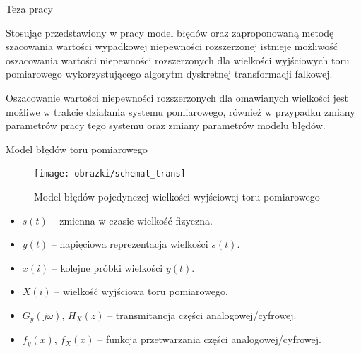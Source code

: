 \documentclass[12pt, polish, aspectratio = 169]{slides}
\begin{document}

\begin{frame}{Teza pracy}
\begin{justify}
Stosując przedstawiony w pracy model błędów oraz zaproponowaną metodę szacowania wartości wypadkowej niepewności rozszerzonej istnieje możliwość oszacowania wartości niepewności rozszerzonych dla wielkości wyjściowych toru pomiarowego wykorzystującego algorytm dyskretnej transformacji falkowej.

Oszacowanie wartości niepewności rozszerzonych dla omawianych wielkości jest możliwe w trakcie działania systemu pomiarowego, również w przypadku zmiany parametrów pracy tego systemu oraz zmiany parametrów modelu błędów.
\end{justify}
\end{frame}


\begin{frame}{Model błędów toru pomiarowego}
\begin{figure}
\texttt{[image: obrazki/schemat\_trans]}
\caption{Model błędów pojedynczej wielkości wyjściowej toru pomiarowego}
\end{figure}
\begin{itemize}
\item $s(t)$ -- zmienna w czasie wielkość fizyczna.
\item $y(t)$ -- napięciowa reprezentacja wielkości $s(t)$.
\item $x(i)$ -- kolejne próbki wielkości $y(t)$.
\item $X(i)$ -- wielkość wyjściowa toru pomiarowego.
\item $G_{y}(j\omega)$, $H_{X}(z)$ -- transmitancja części analogowej/cyfrowej.
\item $f_{y}(x)$, $f_{X}(x)$ -- funkcja przetwarzania części analogowej/cyfrowej.
\end{itemize}
\end{frame}
\end{document}
